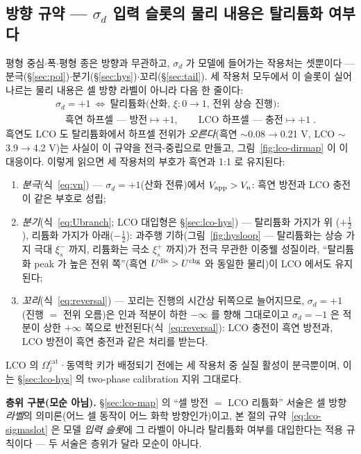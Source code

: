 \subsection{방향 규약 --- $\sigma_d$ 입력 슬롯의 물리 내용은 탈리튬화 여부다}\label{sec:lco-direction}
평형 중심$\cdot$폭$\cdot$평형 종은 방향과 무관하고, $\sigma_d$ 가 모델에 들어가는 작용처는 셋뿐이다 ---
분극(\S\ref{sec:pol})$\cdot$분기(\S\ref{sec:hys})$\cdot$꼬리(\S\ref{sec:tail}). 세 작용처 모두에서 이 슬롯이
실어 나르는 물리 내용은 셀 방향 라벨이 아니라 다음 한 줄이다:
\begin{equation}
\boxed{\;\begin{aligned}
&\sigma_d=+1\ \Leftrightarrow\ \text{탈리튬화(산화, $\xi:0\!\to\!1$, 전위 상승 진행)}:\\
&\quad\text{흑연 하프셀 --- 방전}\mapsto+1,\qquad \text{LCO 하프셀 --- 충전}\mapsto+1\;.
\end{aligned}}
\label{eq:lco-sigmaslot}
\end{equation}
흑연도 LCO 도 탈리튬화에서 하프셀 전위가 \emph{오른다}(흑연 $\sim$0.08$\to$0.21 V, LCO
$\sim$3.9$\to$4.2 V)는 사실이 이 규약을 전극-중립으로 만들고, 그림~\ref{fig:lco-dirmap} 이 이 대응이다.
이렇게 읽으면 세 작용처의 부호가 흑연과 1:1 로 유지된다:
\begin{enumerate}[label=(\alph*),leftmargin=2.2em,itemsep=1pt]
\item \emph{분극}(식~\eqref{eq:vn}) --- $\sigma_d=+1$(산화 전류)에서 $V_{\mathrm{app}}>V_n$: 흑연 방전과 LCO 충전이
같은 부호로 성립;
\item \emph{분기}(식~\eqref{eq:Ubranch}; LCO 대입형은 \S\ref{sec:lco-hys}) --- 탈리튬화 가지가 위
($+\tfrac12$), 리튬화 가지가 아래($-\tfrac12$): 과주행 기하(그림~\ref{fig:hysloop} --- 탈리튬화는 상승
가지 극대 $\xi_s^-$ 까지, 리튬화는 극소 $\xi_s^+$ 까지)가 전극 무관한 이중웰 성질이라, ``탈리튬화 peak 가
높은 전위 쪽''(흑연 $U^{\mathrm{dis}}>U^{\mathrm{chg}}$ 와 동일한 물리)이 LCO 에서도 유지된다;
\item \emph{꼬리}(식~\eqref{eq:reversal}) --- 꼬리는 진행의 시간상 뒤쪽으로 늘어지므로, $\sigma_d=+1$
(진행 $=$ 전위 오름)은 인과 적분이 하한 $-\infty$ 를 향해 그대로이고 $\sigma_d=-1$ 은 적분이 상한 $+\infty$ 쪽으로
반전된다(식~\eqref{eq:reversal}): LCO 충전이 흑연 방전과, LCO 방전이 흑연 충전과 같은 처리를 받는다.
\end{enumerate}
LCO 의 $\Omega_j^\mathrm{cat}$·동역학 키가 배정되기 전에는 세 작용처 중 실질 활성이 분극뿐이며, 이는
\S\ref{sec:lco-hys} 의 two-phase calibration 지위 그대로다.

\textbf{층위 구분(모순 아님).} \S\ref{sec:lco-map} 의 ``셀 방전 $=$ LCO 리튬화'' 서술은 셀 방향
\emph{라벨}의 의미론(어느 셀 동작이 어느 화학 방향인가)이고, 본 절의 규약~\eqref{eq:lco-sigmaslot} 은 모델
\emph{입력 슬롯}에 그 라벨이 아니라 탈리튬화 여부를 대입한다는 적용 규칙이다 --- 두 서술은 층위가 달라 모순이
아니다.

